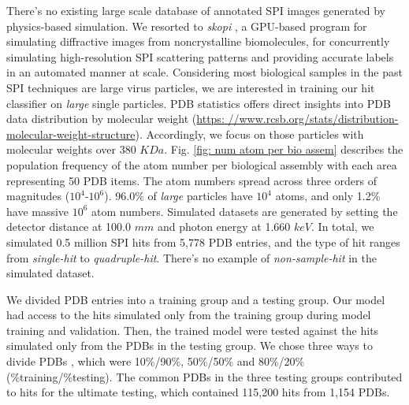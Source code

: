 There's no existing large scale database of annotated SPI images generated by
physics-based simulation.  We resorted to \textit{skopi}
\cite{peckSkopiSimulationPackage2022}, a GPU-based program for simulating
diffractive images from noncrystalline biomolecules, for concurrently simulating
high-resolution SPI scattering patterns and providing accurate labels in an
automated manner at scale.  Considering most biological samples in the past SPI
techniques are large virus particles, we are interested in training our hit
classifier on \textit{large} single particles.  PDB statistics offers direct
insights into PDB data distribution by molecular weight (\url{https:
//www.rcsb.org/stats/distribution-molecular-weight-structure}).  Accordingly, we
focus on those particles with molecular weights over 380 $KDa$.  Fig.  \ref{fig:
num atom per bio assem} describes the population frequency of the atom number
per biological assembly with each area representing 50 PDB items.  The atom
numbers spread across three orders of magnitudes ($10^4\text{-}10^6$).  96.0\%
of \textit{large} particles have $10^4$ atoms, and only 1.2\% have massive
$10^6$ atom numbers. Simulated datasets are generated by setting the detector
distance at 100.0 $mm$ and photon energy at 1.660 $keV$.  In total, we simulated
0.5 million SPI hits from 5,778 PDB entries, and the type of hit ranges from
\textit{single-hit} to \textit{quadruple-hit}.  There's no example of
\textit{non-sample-hit} in the simulated dataset.

We divided PDB entries into a training group and a testing group.  Our model had
access to the hits simulated only from the training group during model training
and validation.  Then, the trained model were tested against the hits
simulated only from the PDBs in the testing group.  We chose three ways to
divide PDBs , which were 10\%/90\%, 50\%/50\% and 80\%/20\% (\%training/\%testing).  
The common PDBs in the three testing groups contributed to hits for the
ultimate testing, which contained 115,200 hits from 1,154 PDBs.  

